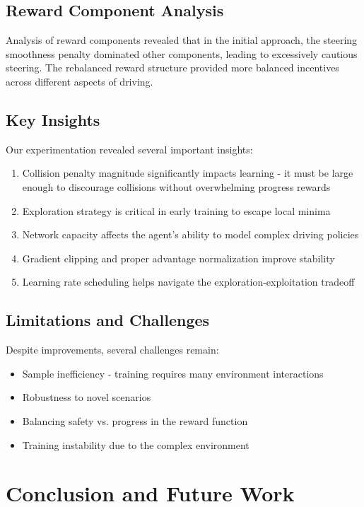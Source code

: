 \documentclass[11pt,a4paper]{article}
\begin{document}
\subsection{Reward Component Analysis}
Analysis of reward components revealed that in the initial approach, the steering smoothness penalty dominated other components, leading to excessively cautious steering. The rebalanced reward structure provided more balanced incentives across different aspects of driving.

\subsection{Key Insights}
Our experimentation revealed several important insights:
\begin{enumerate}
    \item Collision penalty magnitude significantly impacts learning - it must be large enough to discourage collisions without overwhelming progress rewards
    \item Exploration strategy is critical in early training to escape local minima
    \item Network capacity affects the agent's ability to model complex driving policies
    \item Gradient clipping and proper advantage normalization improve stability
    \item Learning rate scheduling helps navigate the exploration-exploitation tradeoff
\end{enumerate}

\subsection{Limitations and Challenges}
Despite improvements, several challenges remain:
\begin{itemize}
    \item Sample inefficiency - training requires many environment interactions
    \item Robustness to novel scenarios
    \item Balancing safety vs. progress in the reward function
    \item Training instability due to the complex environment
\end{itemize}

\section{Conclusion and Future Work}
\end{document}
